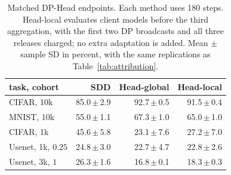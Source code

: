 \begin{table}[t]
\centering
\caption{Matched DP-Head endpoints. Each method uses 180 steps. Head-local evaluates client models before the third aggregation, with the first two DP broadcasts and all three releases charged; no extra adaptation is added. Mean $\pm$ sample SD in percent, with the same replications as Table~\ref{tab:attribution}.}
\label{tab:head-local}
\small\setlength{\tabcolsep}{3pt}
\begin{tabular}{@{}lrrr@{}}\toprule
task, cohort & SDD & Head-global & Head-local \\\midrule
CIFAR, 10k & 85.0\,$\pm$\,2.9 & 92.7\,$\pm$\,0.5 & 91.5\,$\pm$\,0.4 \\
MNIST, 10k & 55.0\,$\pm$\,1.1 & 67.3\,$\pm$\,1.0 & 65.0\,$\pm$\,1.0 \\
CIFAR, 1k & 45.6\,$\pm$\,5.8 & 23.1\,$\pm$\,7.6 & 27.2\,$\pm$\,7.0 \\
Usenet, 1k, $0.25$ & 24.8\,$\pm$\,3.0 & 22.7\,$\pm$\,4.7 & 22.8\,$\pm$\,2.6 \\
Usenet, 3k, $1$ & 26.3\,$\pm$\,1.6 & 16.8\,$\pm$\,0.1 & 18.3\,$\pm$\,0.3 \\
\bottomrule\end{tabular}
\end{table}
